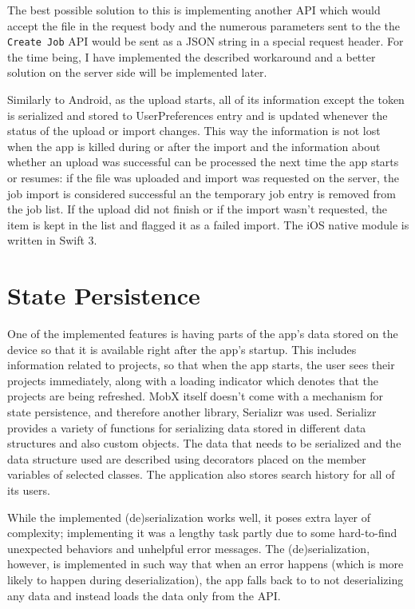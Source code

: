 The best possible solution to this is implementing another API which would accept the file in the request body and the numerous parameters sent to the the \texttt{Create Job} API would be sent as a JSON string in a special request header. For the time being, I have implemented the described workaround and a better solution on the server side will be implemented later. 


Similarly to Android, as the upload starts, all of its information except the token is serialized and stored to UserPreferences entry and is updated whenever the status of the upload or import changes. This way the information is not lost when the app is killed during or after the import and the information about whether an upload was successful can be processed the next time the app starts or resumes: if the file was uploaded and import was requested on the server, the job import is considered successful an the  temporary job entry is removed from the job list. If the upload did not finish or if the import wasn't requested, the item is kept in the list and flagged it as a failed import. The iOS native module is written in Swift 3.


\section{State Persistence}

One of the implemented features is having parts of the app's data stored on the device so that it is available right after the app’s startup. This includes information related to projects, so that when the app starts, the user sees their projects immediately, along with a loading indicator which denotes that the projects are being refreshed. MobX itself doesn't come with a mechanism for state persistence, and therefore another library, Serializr was used. Serializr provides a variety of functions for serializing data stored in different data structures and also custom objects. The data that needs to be serialized and the data structure used are described using decorators placed on the member variables of selected classes. The application also stores search history for all of its users. 

While the implemented (de)serialization works well, it poses extra layer of complexity; implementing it was a lengthy task partly due to some hard-to-find unexpected behaviors and unhelpful error messages. The (de)serialization, however, is implemented in such way that when an error happens (which is more likely to happen during deserialization), the app falls back to to not deserializing any data and instead loads the data only from the API.


